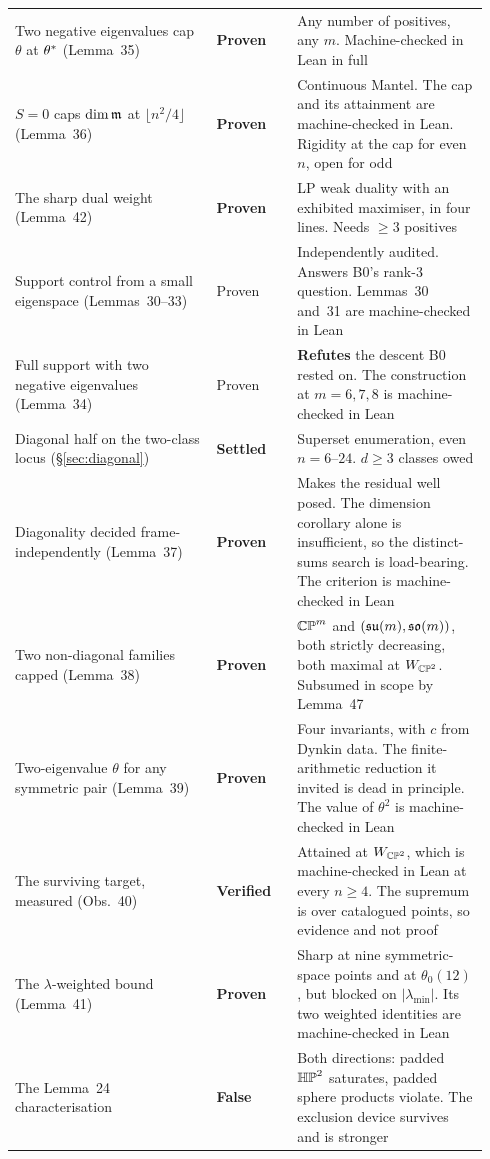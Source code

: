 \begin{longtable}{@{}p{0.40\linewidth}p{0.16\linewidth}p{0.38\linewidth}@{}}
Two negative eigenvalues cap $\theta$ at $\theta^{*}$ (Lemma~35) & \textbf{Proven} & Any number of positives, any $m$. Machine-checked in Lean in full \\
$S=0$ caps $\dim\mathfrak{m}$ at $\lfloor n^2/4\rfloor$ (Lemma~36) & \textbf{Proven} & Continuous Mantel. The cap and its attainment are machine-checked in Lean. Rigidity at the cap for even $n$, open for odd \\
The sharp dual weight (Lemma~42) & \textbf{Proven} & LP weak duality with an exhibited maximiser, in four lines. Needs $\ge3$ positives \\
Support control from a small eigenspace (Lemmas~30--33) & Proven & Independently audited. Answers B0's rank-3 question. Lemmas~30 and~31 are machine-checked in Lean \\
Full support with two negative eigenvalues (Lemma~34) & Proven & \textbf{Refutes} the descent B0 rested on. The construction at $m=6,7,8$ is machine-checked in Lean \\
Diagonal half on the two-class locus (\S\ref{sec:diagonal}) & \textbf{Settled} & Superset enumeration, even $n=6$--$24$. $d\ge3$ classes owed \\
Diagonality decided frame-independently (Lemma~37) & \textbf{Proven} & Makes the residual well posed. The dimension corollary alone is insufficient, so the distinct-sums search is load-bearing. The criterion is machine-checked in Lean \\
Two non-diagonal families capped (Lemma~38) & \textbf{Proven} & $\mathbb{CP}^m$ and $(\mathfrak{su}(m),\mathfrak{so}(m))$, both strictly decreasing, both maximal at $W_{\mathbb{CP}^2}$. Subsumed in scope by Lemma~47 \\
Two-eigenvalue $\theta$ for any symmetric pair (Lemma~39) & \textbf{Proven} & Four invariants, with $c$ from Dynkin data. The finite-arithmetic reduction it invited is dead in principle. The value of $\theta^2$ is machine-checked in Lean \\
The surviving target, measured (Obs.~40) & \textbf{Verified} & Attained at $W_{\mathbb{CP}^2}$, which is machine-checked in Lean at every $n\ge4$. The supremum is over catalogued points, so evidence and not proof \\
The $\lambda$-weighted bound (Lemma~41) & \textbf{Proven} & Sharp at nine symmetric-space points and at $\theta_0(12)$, but blocked on $|\lambda_{\min}|$. Its two weighted identities are machine-checked in Lean \\
The Lemma~24 characterisation & \textbf{False} & Both directions: padded $\mathbb{HP}^2$ saturates, padded sphere products violate. The exclusion device survives and is stronger \\

\end{longtable}
